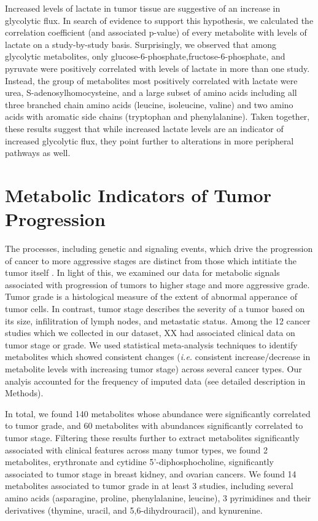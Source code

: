\documentclass[10pt]{article}
\begin{document}
Increased levels of lactate in tumor tissue are suggestive of an increase in glycolytic flux. In search of evidence to support this hypothesis, we calculated the correlation coefficient (and associated p-value) of every metabolite with levels of lactate on a study-by-study basis. Surprisingly, we observed that among glycolytic metabolites, only glucose-6-phosphate,fructose-6-phosphate, and pyruvate were positively correlated with levels of lactate in more than one study. Instead, the group of metabolites most positively correlated with lactate were urea, S-adenosylhomocysteine, and a large subset of amino acids including all three branched chain amino acids (leucine, isoleucine, valine) and two amino acids with aromatic side chains (tryptophan and phenylalanine). Taken together, these results suggest that while increased lactate levels are an indicator of increased glycolytic flux, they point further to alterations in more peripheral pathways as well.


\section{Metabolic Indicators of Tumor Progression}
The processes, including genetic and signaling events, which drive the progression of cancer to more aggressive stages are distinct from those which intitiate the tumor itself \cite{CITE}. In light of this, we examined our data for metabolic signals associated with progression of tumors to higher stage and more aggressive grade. Tumor grade is a histological measure of the extent of abnormal apperance of tumor cells. In contrast, tumor stage describes the severity of a tumor based on its size, infilitration of lymph nodes, and metastatic status. Among the 12 cancer studies which we collected in our dataset, XX had associated clinical data on tumor stage or grade. We used statistical meta-analysis techniques to identify metabolites which showed consistent changes (\textit{i.e.} consistent increase/decrease in metabolite levels with increasing tumor stage) across several cancer types. Our analyis accounted for the frequency of imputed data (see detailed description in Methods).

In total, we found 140 metabolites whose abundance were significantly correlated to tumor grade, and 60 metabolites with abundances significantly correlated to tumor stage. Filtering these results further to extract metabolites significantly associated with clinical features across many tumor types, we found 2 metabolites, erythronate and cytidine 5'-diphosphocholine, significantly associated to tumor stage in breast kidney, and ovarian cancers. We found 14 metabolites associated to tumor grade in at least 3 studies, including several amino acids (asparagine, proline, phenylalanine, leucine), 3 pyrimidines and their derivatives (thymine, uracil, and 5,6-dihydrouracil), and kynurenine. 
\end{document}
